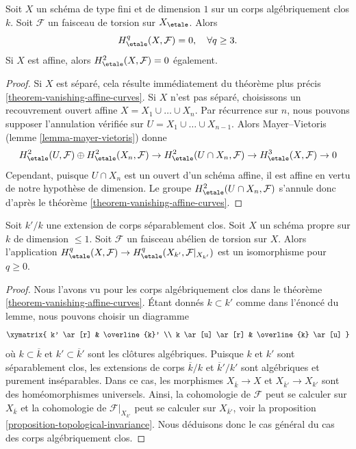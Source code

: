 \begin{theorem}
\label{theorem-vanishing-curves}
Soit $X$ un schéma de type fini et de dimension $1$ sur un
corps algébriquement clos $k$. Soit $\mathcal{F}$ un faisceau de torsion
sur $X_\etale$. Alors
$$
H_\etale^q(X, \mathcal{F}) = 0, \quad \forall q \geq 3.
$$
Si $X$ est affine, alors $H_\etale^2(X, \mathcal{F}) = 0$ également.
\end{theorem}

\begin{proof}
Si $X$ est séparé, cela résulte immédiatement du théorème plus précis
\ref{theorem-vanishing-affine-curves}.
Si $X$ n'est pas séparé, choisissons un recouvrement ouvert affine
$X = X_1 \cup \ldots \cup X_n$. Par récurrence sur $n$, nous pouvons supposer
l'annulation vérifiée sur $U = X_1 \cup \ldots \cup X_{n - 1}$.
Alors Mayer--Vietoris (lemme \ref{lemma-mayer-vietoris}) donne
$$
H^2_\etale(U, \mathcal{F}) \oplus H^2_\etale(X_n, \mathcal{F}) \to
H^2_\etale(U \cap X_n, \mathcal{F}) \to
H^3_\etale(X, \mathcal{F}) \to 0
$$
Cependant, puisque $U \cap X_n$ est un ouvert d'un schéma affine,
il est affine en vertu de notre hypothèse de dimension. Le groupe
$H^2_\etale(U \cap X_n, \mathcal{F})$ s'annule donc
d'après le théorème \ref{theorem-vanishing-affine-curves}.
\end{proof}

\begin{lemma}
\label{lemma-base-change-dim-1-separably-closed}
Soit $k'/k$ une extension de corps séparablement clos.
Soit $X$ un schéma propre sur $k$ de dimension $\leq 1$.
Soit $\mathcal{F}$ un faisceau abélien de torsion sur $X$.
Alors l'application $H^q_\etale(X, \mathcal{F}) \to
H^q_\etale(X_{k'}, \mathcal{F}|_{X_{k'}})$ est un isomorphisme
pour $q \geq 0$.
\end{lemma}

\begin{proof}
Nous l'avons vu pour les corps algébriquement clos dans le
théorème \ref{theorem-vanishing-affine-curves}.
Étant donnés $k \subset k'$ comme dans l'énoncé du lemme, nous pouvons
choisir un diagramme
$$
\xymatrix{
k' \ar[r] & \overline{k}' \\
k \ar[u] \ar[r] & \overline{k} \ar[u]
}
$$
où $k \subset \overline{k}$ et $k' \subset \overline{k}'$ sont
les clôtures algébriques. Puisque $k$ et $k'$ sont séparablement clos,
les extensions de corps
$\overline{k}/k$ et $\overline{k}'/k'$
sont algébriques et purement inséparables. Dans ce cas, les morphismes
$X_{\overline{k}} \to X$ et $X_{\overline{k}'} \to X_{k'}$
sont des homéomorphismes universels. Ainsi, la cohomologie de $\mathcal{F}$
peut se calculer sur $X_{\overline{k}}$ et la cohomologie
de $\mathcal{F}|_{X_{k'}}$ peut se calculer sur $X_{\overline{k}'}$,
voir la proposition \ref{proposition-topological-invariance}.
Nous déduisons donc le cas général du cas des corps algébriquement
clos.
\end{proof}






